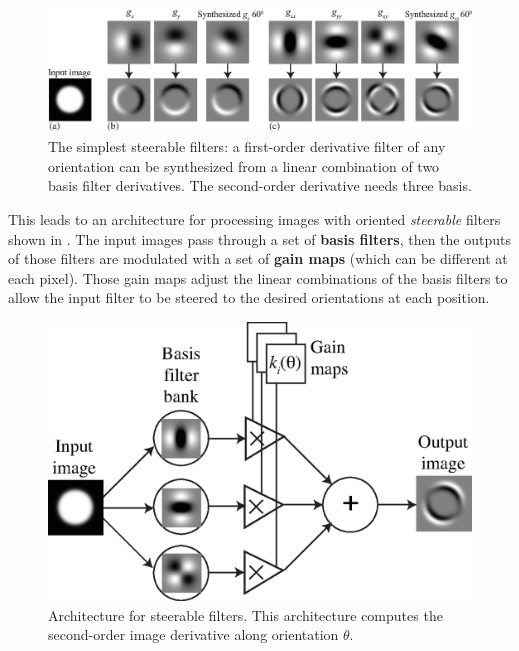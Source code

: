 %



\begin{figure}[h]
	\centerline{
		\includegraphics[width=1\linewidth]{figures/spatial_filter_sets/steer1.eps}
	}
	\caption{The simplest steerable filters: a first-order derivative filter of any
		orientation can be synthesized from a linear combination of two
		basis filter derivatives. The second-order derivative needs three basis.}
	\label{fig:steer1}
\end{figure}





This leads to an architecture for processing images with oriented {\em steerable} filters shown in \fig{\ref{fig:steer1arc}}. The input images pass through a set of {\bf basis filters},
then the outputs of those filters are modulated with a set of {\bf gain maps}
(which can be different at each pixel).  Those gain maps adjust the
linear combinations of the basis filters to allow the input
filter to be steered to the desired orientations at each position.

\begin{figure}[h]
	\centerline{
		\includegraphics[width=0.6\linewidth]{figures/spatial_filter_sets/steer_architecture.eps}
	}
	\caption{Architecture for steerable filters. This architecture computes the second-order image derivative along orientation $\theta$.}
	\label{fig:steer1arc}
\end{figure}

